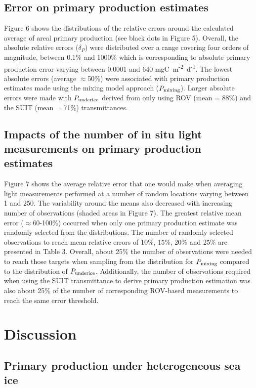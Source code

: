 \documentclass[draft]{agujournal2018}
\newcommand{\ppmixing}{\ensuremath{P_{\textnormal{\scriptsize mixing}}}}
\newcommand{\ppunderice}{\ensuremath{P_{\textnormal{\scriptsize underice}}}}
\newcommand{\dailypp}{mgC~m\textsuperscript{-2}~d\textsuperscript{-1}}
\begin{document}
\subsection{Error on primary production estimates}

Figure 6 shows the distributions of the relative errors around the calculated average of areal primary production (see black dots in Figure 5). Overall, the absolute relative errors ($\delta_P$) were distributed over a range covering four orders of magnitude, between 0.1\% and 1000\% which is corresponding to absolute primary production error varying between 0.0001 and 640 \dailypp{}. The lowest absolute errors (average $\approx$50\%) were associated with primary production estimates made using the mixing model approach (\ppmixing{}). Larger absolute errors were made with \ppunderice{} derived from only using ROV (mean = 88\%) and the SUIT (mean = 71\%) transmittances.

\subsection{Impacts of the number of in situ light measurements on primary production estimates}

Figure 7 shows the average relative error that one would make when averaging light measurements performed at a number of random locations varying between 1 and 250. The variability around the means also decreased with increasing number of observations (shaded areas in Figure 7). The greatest relative mean error ($\approx$60-100\%) occurred when only one primary production estimate was randomly selected from the distributions. The number of randomly selected observations to reach mean relative errors of 10\%, 15\%, 20\% and 25\% are presented in Table 3. Overall, about 25\% the number of observations were needed to reach those targets when sampling from the distribution for \ppmixing{} compared to the distribution of \ppunderice{}. Additionally, the number of observations required when using the SUIT transmittance to derive primary production estimation was also about 25\% of the number of corresponding ROV-based measurements to reach the same error threshold.

\section{Discussion}

\subsection{Primary production under heterogeneous sea ice}
\end{document}

